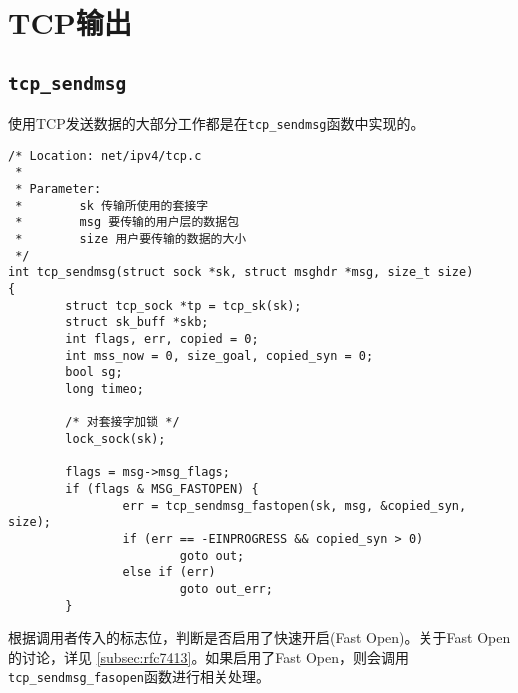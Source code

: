 \chapter{TCP输出}
\label{chapter:tcp_output}

\minitoc

\section{\texttt{tcp_sendmsg}}
使用TCP发送数据的大部分工作都是在\texttt{tcp_sendmsg}函数中实现的。

\begin{verbatim}
/* Location: net/ipv4/tcp.c
 *
 * Parameter:
 *        sk 传输所使用的套接字
 *        msg 要传输的用户层的数据包
 *        size 用户要传输的数据的大小
 */
int tcp_sendmsg(struct sock *sk, struct msghdr *msg, size_t size)
{
        struct tcp_sock *tp = tcp_sk(sk);
        struct sk_buff *skb;
        int flags, err, copied = 0;
        int mss_now = 0, size_goal, copied_syn = 0;
        bool sg;
        long timeo;

        /* 对套接字加锁 */
        lock_sock(sk);

        flags = msg->msg_flags;
        if (flags & MSG_FASTOPEN) {
                err = tcp_sendmsg_fastopen(sk, msg, &copied_syn, size);
                if (err == -EINPROGRESS && copied_syn > 0)
                        goto out;
                else if (err)
                        goto out_err;
        }
\end{verbatim}
根据调用者传入的标志位，判断是否启用了快速开启(Fast Open)。关于Fast Open的讨论，详见
\ref{subsec:rfc7413}。如果启用了Fast Open，则会调用
\texttt{tcp_sendmsg_fasopen}函数进行相关处理。

